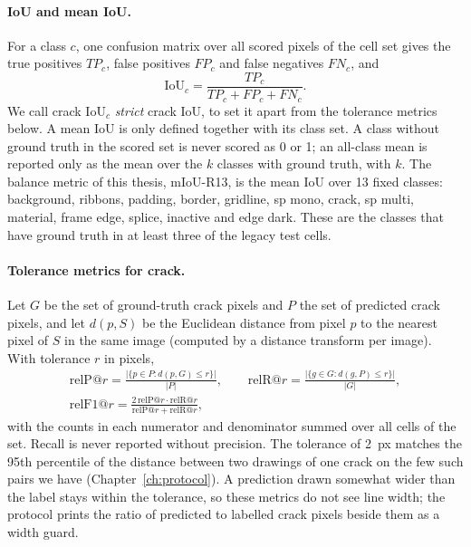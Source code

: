 \paragraph{IoU and mean IoU.} For a class $c$, one confusion matrix over all scored pixels of the cell set gives the true
positives $\mathit{TP}_c$, false positives $\mathit{FP}_c$ and false negatives $\mathit{FN}_c$, and
\begin{equation}
  \mathrm{IoU}_c = \frac{\mathit{TP}_c}{\mathit{TP}_c + \mathit{FP}_c + \mathit{FN}_c}.
\end{equation}
We call crack $\mathrm{IoU}_c$ \emph{strict} crack IoU, to set it apart from the tolerance metrics below. A mean IoU is only
defined together with its class set. A class without ground truth in the scored set is never scored as 0 or 1; an all-class
mean is reported only as the mean over the $k$ classes with ground truth, with $k$. The balance metric of this thesis,
mIoU-R13, is the mean IoU over 13 fixed classes: background, ribbons, padding, border, gridline, sp mono, crack, sp multi,
material, frame edge, splice, inactive and edge dark. These are the classes that have ground truth in at least three of the
legacy test cells.

\paragraph{Tolerance metrics for crack.} Let $G$ be the set of ground-truth crack pixels and $P$ the set of predicted crack
pixels, and let $d(p, S)$ be the Euclidean distance from pixel $p$ to the nearest pixel of $S$ in the same image (computed by
a distance transform per image). With tolerance $r$ in pixels,
\begin{equation}
\begin{gathered}
  \mathrm{relP@}r = \frac{\lvert\{p \in P : d(p, G) \le r\}\rvert}{\lvert P \rvert}, \qquad
  \mathrm{relR@}r = \frac{\lvert\{g \in G : d(g, P) \le r\}\rvert}{\lvert G \rvert}, \\
  \mathrm{relF1@}r = \frac{2\,\mathrm{relP@}r \cdot \mathrm{relR@}r}{\mathrm{relP@}r + \mathrm{relR@}r},
\end{gathered}
\end{equation}
with the counts in each numerator and denominator summed over all cells of the set. Recall is never reported without
precision. The tolerance of 2~px matches the 95th percentile of the distance
between two drawings of one crack on the few such pairs we have (Chapter~\ref{ch:protocol}). A prediction drawn somewhat
wider than the label stays within the tolerance, so these metrics do not see line width; the protocol prints the ratio of
predicted to labelled crack pixels beside them as a width guard.

